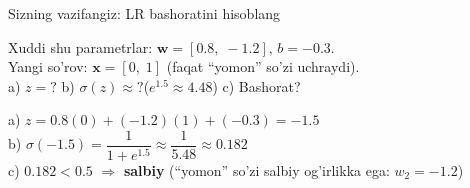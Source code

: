 \documentclass[aspectratio=169,11pt]{beamer}
\begin{document}
\begin{frame}{Sizning vazifangiz: LR bashoratini hisoblang}
  \begin{tcolorbox}[warnbox,title=Vazifa (3 daqiqa)]
    \small
    Xuddi shu parametrlar:
    $\mathbf{w}=[0.8,\;{-}1.2]$,\; $b=-0.3$.\\[4pt]
    Yangi so'rov: $\mathbf{x}=[0,\;1]$
    \quad (faqat ``yomon'' so'zi uchraydi).\\[4pt]
    a)\; $z = ?$\qquad
    b)\; $\sigma(z)\approx ?$\quad ($e^{1.5}\approx 4.48$)\qquad
    c)\; Bashorat?
  \end{tcolorbox}
  \pause
  \begin{tcolorbox}[okbox,title=Javob]
    \small
    a)\; $z = 0.8(0)+(-1.2)(1)+(-0.3) = -1.5$\\[4pt]
    b)\; $\sigma(-1.5)=\dfrac{1}{1+e^{1.5}}
         \approx\dfrac{1}{5.48}\approx 0.182$\\[4pt]
    c)\; $0.182<0.5$
         $\Rightarrow$ \textcolor{deepred}{\textbf{salbiy}} \checkmark\quad
         \textcolor{halfgray}{\footnotesize
           (``yomon'' so'zi salbiy og'irlikka ega: $w_2=-1.2$)}
  \end{tcolorbox}
\end{frame}
\end{document}
